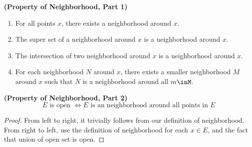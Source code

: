 \documentclass{report}
\begin{document}
\begin{corollary}
\label{2.1.7}
\textbf{(Property of Neighborhood, Part 1)} 
\begin{enumerate}[label=(\alph*)]
  \item For all points $x$, there exists a neighborhood around $x$.\\
  \item The super set of a neighborhood around  $x$ is a neighborhood around $x$.\\
  \item The intersection of two neighborhood around  $x$ is a neighborhood around $x$.\\
  \item 
For each neighborhood $N$ around $x$, there exists a smaller neighborhood $M$ around $x$ such that  $N$ is a neighborhood around all $m \inM$.
\end{enumerate}
\end{corollary}
\begin{theorem}
\label{2.1.8}
\textbf{(Property of Neighborhood, Part 2)} 
\begin{equation*}
  \text{ $E$ is open $\iff E$ is an neighborhood around all points in $E$}
\end{equation*}
\end{theorem}
\begin{proof}
From left to right, it trivially follows from our definition of neighborhood.\\

From right to left, use the definition of neighborhood for each $x\in E$, and the fact that union of open set is open. 
\end{proof}
\end{document}
